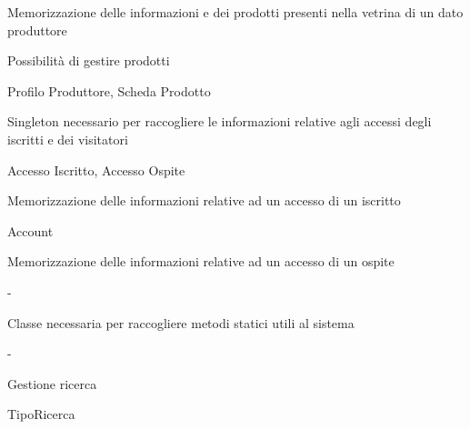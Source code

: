 
{\begin{itemWork}
    \item Memorizzazione delle informazioni e dei prodotti presenti nella vetrina di un dato produttore
	\item Possibilità di gestire prodotti
\end{itemWork}}
{\begin{itemWork}
	\item Profilo Produttore, Scheda Prodotto
\end{itemWork}}


{\begin{itemWork}
	\item Singleton necessario per raccogliere le informazioni relative agli accessi degli iscritti e dei visitatori
\end{itemWork}}
{\begin{itemWork}
	\item Accesso Iscritto, Accesso Ospite
\end{itemWork}}



{\begin{itemWork}
	\item Memorizzazione delle informazioni relative ad un accesso di un iscritto
\end{itemWork}}
{\begin{itemWork}
	\item Account
\end{itemWork}}



{\begin{itemWork}
	\item Memorizzazione delle informazioni relative ad un accesso di un ospite
\end{itemWork}}
{-}


{\begin{itemWork}
	\item Classe necessaria per raccogliere metodi statici utili al sistema
\end{itemWork}}
{-}


{\begin{itemWork}
	\item Gestione ricerca
\end{itemWork}}
{TipoRicerca}

